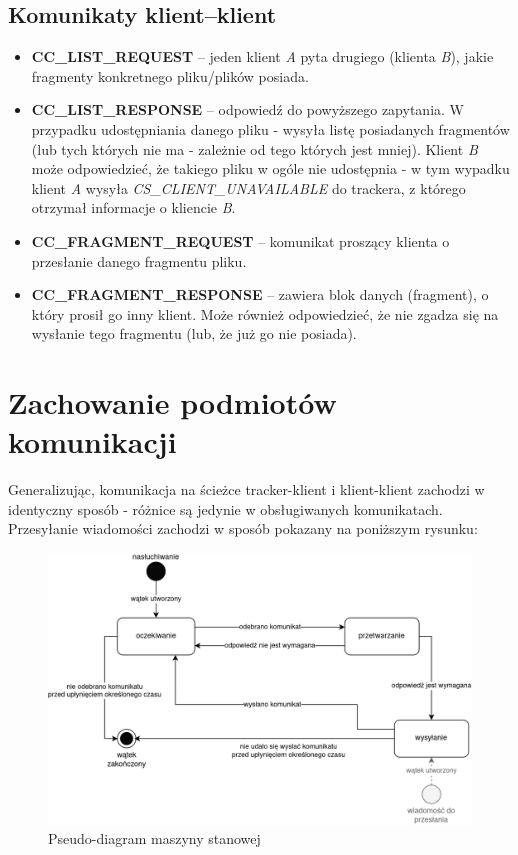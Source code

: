 \documentclass[11pt]{article}
\begin{document}
\subsection{Komunikaty klient--klient}
\begin{itemize}
\item \textbf{CC\_LIST\_REQUEST} -- jeden klient \textsl{A} pyta drugiego (klienta \textsl{B}), jakie fragmenty konkretnego pliku/plików posiada.
\item \textbf{CC\_LIST\_RESPONSE} -- odpowiedź do powyższego zapytania. W przypadku udostępniania danego pliku - wysyła listę posiadanych fragmentów (lub tych których nie ma - zależnie od tego których jest mniej). Klient \textsl{B} może odpowiedzieć, że takiego pliku w ogóle nie udostępnia - w tym wypadku klient \textsl{A} wysyła \textsl{CS\_CLIENT\_UNAVAILABLE} do trackera, z którego otrzymał informacje o kliencie \textsl{B}.
\item \textbf{CC\_FRAGMENT\_REQUEST} -- komunikat proszący klienta o przesłanie danego fragmentu pliku.
\item \textbf{CC\_FRAGMENT\_RESPONSE} -- zawiera blok danych (fragment), o który prosił go inny klient. Może również odpowiedzieć, że nie zgadza się na wysłanie tego fragmentu (lub, że już go nie posiada).
\end{itemize}

\section{Zachowanie podmiotów komunikacji}
Generalizując, komunikacja na ścieżce tracker-klient i klient-klient zachodzi w identyczny sposób - różnice są jedynie w obsługiwanych komunikatach. Przesyłanie wiadomości zachodzi w sposób pokazany na poniższym rysunku:

\begin{figure}[h]
\caption{Pseudo-diagram maszyny stanowej}
\centering
\includegraphics[scale=0.45]{diagsocket}
\end{figure}
\end{document}
